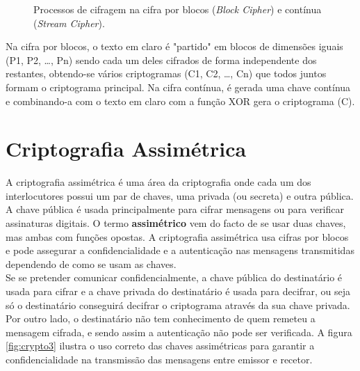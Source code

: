 \documentclass[a4paper,11pt,openright,oneside]{report}
\begin{document}
\begin{figure}[ht]
\center
{}
\caption{Processos de cifragem na cifra por blocos (\textit{Block Cipher}) e contínua (\textit{Stream Cipher}).}
\label{fig:crypto2}
\end{figure}

Na cifra por blocos, o texto em claro é "partido" em blocos de dimensões iguais (P1, P2, …, Pn) sendo cada um deles cifrados de forma independente dos restantes, obtendo-se vários criptogramas (C1, C2, …, Cn) que todos juntos formam o criptograma principal. Na cifra contínua, é gerada uma chave contínua e combinando-a com o texto em claro com a função XOR gera o criptograma (C).

\section{Criptografia Assimétrica}
\label{chap.assimétrica}

A criptografia assimétrica é uma área da criptografia onde cada um dos interlocutores possui um par de chaves, uma privada (ou secreta) e outra pública. A chave pública é usada principalmente para cifrar mensagens ou para verificar assinaturas digitais. O termo \textbf{assimétrico} vem do facto de se usar duas chaves, mas ambas com funções opostas. A criptografia assimétrica usa cifras por blocos e pode assegurar a confidencialidade e a autenticação nas mensagens transmitidas dependendo de como se usam as chaves.\\

Se se pretender comunicar confidencialmente, a chave pública do destinatário é usada para cifrar e a chave privada do destinatário é usada para decifrar, ou seja só o destinatário conseguirá decifrar o criptograma através da sua chave privada. Por outro lado, o destinatário não tem conhecimento de quem remeteu a mensagem cifrada, e sendo assim a autenticação não pode ser verificada. A figura \ref{fig:crypto3} ilustra o uso correto das chaves assimétricas para garantir a confidencialidade na transmissão das mensagens entre emissor e recetor.
\end{document}
